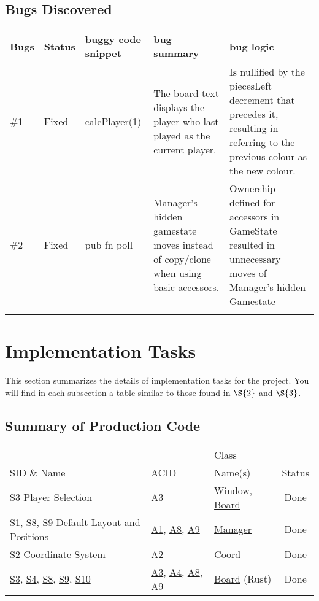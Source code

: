 \documentclass[11pt]{article}
\begin{document}
\subsection{Bugs Discovered}
\label{sec:org2c336eb}
\begin{center}
\begin{tabular}{|l|l|m{2.0cm}|m{3.5cm}|m{5.0cm}|}
Bugs & Status & buggy code snippet & bug summary & bug logic\\
\hline
\#1 & Fixed & calcPlayer(1) & The board text displays the player who last played as the current player. & Is nullified by the piecesLeft decrement that precedes it, resulting in referring to the previous colour as the new colour.\\
\hline
\#2 & Fixed & pub fn poll & Manager's hidden gamestate moves instead of copy/clone when using basic accessors. & Ownership defined for accessors in GameState resulted in unnecessary moves of Manager's hidden Gamestate\\
 &  &  &  & \\
\end{tabular}
\end{center}

\section{Implementation Tasks}
\label{sec:org8f1a5f7}
This section summarizes the details of implementation tasks for the project. You will find in each
subsection a table similar to those found in \hyperref[sec:org85871bb]{\(\S{2}\)} and \hyperref[sec:org6661b71]{\(\S{3}\)}.

\subsection{Summary of Production Code}
\label{sec:org899980a}

\begin{center}
\begin{tabular}{|p{4.5cm}|p{3.5cm}|p{4.5cm}|c|}
 &  & Class & \\
SID \& Name & ACID & Name(s) & Status\\
\hline
\hyperref[sec:org6661b71]{S3} Player Selection & \hyperref[sec:orgeafb96c]{A3} & \hyperref[sec:org157483c]{Window, Board} & Done\\
\hyperref[sec:org67174d3]{S1}, \hyperref[sec:org32a9c34]{S8}, \hyperref[sec:org5998e16]{S9} Default Layout and Positions & \hyperref[sec:orgd2db761]{A1}, \hyperref[sec:org7a2a0ef]{A8}, \hyperref[sec:orgd4d8544]{A9} & \hyperref[sec:org8882195]{Manager} & Done\\
\hyperref[sec:org85871bb]{S2} Coordinate System & \hyperref[sec:orgf5fa540]{A2} & \hyperref[sec:org5019437]{Coord} & Done\\
\hyperref[sec:org6661b71]{S3}, \hyperref[sec:org47fb86d]{S4}, \hyperref[sec:org32a9c34]{S8}, \hyperref[sec:org5998e16]{S9}, \hyperref[sec:org63225c5]{S10} & \hyperref[sec:orgeafb96c]{A3}, \hyperref[sec:org421b2d5]{A4}, \hyperref[sec:org7a2a0ef]{A8}, \hyperref[sec:orgd4d8544]{A9} & \hyperref[sec:orgecdab17]{Board} (Rust) & Done\\
\end{tabular}
\end{center}
\end{document}
